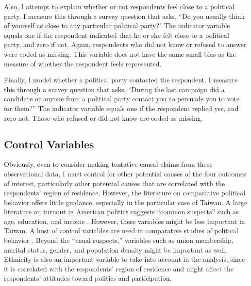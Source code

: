\documentclass[12pt]{article}
\begin{document}
Also, I attempt to explain whether or not respondents feel close to a political party. I measure this through a survey question that asks, ``Do you usually think of yourself as close to any particular political party?" The indicator variable equals one if the respondent indicated that he or she felt close to a political party, and zero if not. Again, respondents who did not know or refused to answer were coded as missing. This variable does not have the same small bias as the measure of whether the respondent feels represented.

Finally, I model whether a political party contacted the respondent. I measure this through a survey question that asks, ``During the last campaign did a candidate or anyone from a political party contact you to persuade you to vote for them?'' The indicator variable equals one if the respondent replied yes, and zero not. Those who refused or did not know are coded as missing.

\subsection*{Control Variables}

Obviously, even to consider making tentative causal claims from these observational data, I must control for other potential causes of the four outcomes of interest, particularly other potential causes that are correlated with the respondents' region of residence. However, the literature on comparative political behavior offers little guidance, especially in the particular case of Taiwan. A large literature on turnout in American politics suggests ``common suspects'' such as age, education, and income \citep{Campbelletal1960, RosenstoneHansen1993}. However, these variables might be less important in Taiwan. A host of control variables are used in comparative studies of political behavior \citep[e.g.][]{KarpBanducci2008, Blais2000}. Beyond the ``usual suspects,'' variables such as union membership, marital status, gender, and population density might be important as well. Ethnicity is also an important variable to take into account in the analysis, since it is correlated with the respondents' region of residence and might affect the respondents' attitudes toward politics and participation.
\end{document}
